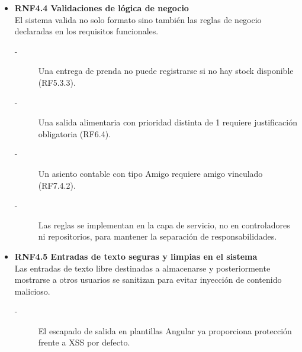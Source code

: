 \begin{itemize}
    \item \textbf{RNF4.4 Validaciones de lógica de negocio} \\
    El sistema valida no solo formato sino también las reglas de negocio
    declaradas en los requisitos funcionales.
    \begin{description}
        \item[-] Una entrega de prenda no puede registrarse si no hay stock disponible (RF5.3.3). 
        \item[-] Una salida alimentaria con prioridad distinta de 1 requiere justificación obligatoria (RF6.4). 
        \item[-] Un asiento contable con tipo Amigo requiere amigo vinculado (RF7.4.2).
        \item[-] Las reglas se implementan en la capa de servicio, no en
        controladores ni repositorios, para mantener la separación de
        responsabilidades.
    \end{description}


    \item \textbf{RNF4.5 Entradas de texto seguras y limpias en el sistema} \\
    Las entradas de texto libre destinadas a almacenarse y posteriormente
    mostrarse a otros usuarios se sanitizan para evitar inyección de
    contenido malicioso.
    \begin{description}
        \item[-] El escapado de salida en plantillas Angular ya proporciona
        protección frente a XSS por defecto. 
    \end{description}
\end{itemize}


